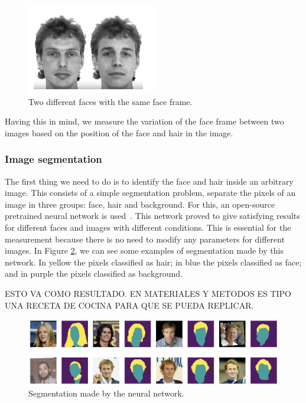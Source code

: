 \documentclass[review]{elsarticle}
\begin{document}
\begin{figure}[H]
  \includegraphics[width=0.5\textwidth, center]{Images/face_frame.png}
  \caption{Two different faces with the same face frame.}
  \label{fig:faceframe}
\end{figure}

Having this in mind, we measure the variation of the face frame between two images based on the position of the face and hair in the image.

\subsubsection{Image segmentation}
The first thing we need to do is to identify the face and hair inside an arbitrary image. This consists of a simple segmentation problem, separate the pixels of an image in three groups: face, hair and background. For this, an open-source pretrained neural network is used~\citep{segmentationgithub}. This network proved to give satisfying results for different faces and images with different conditions. This is essential for the measurement because there is no need to modify any parameters for different images. In Figure \ref{fig:segmentation}, we can see some examples of segmentation made by this network. In yellow the pixels classified as hair; in blue the pixels classified as face; and in purple the pixels classified as background.


ESTO VA COMO RESULTADO.  EN MATERIALES Y METODOS ES TIPO UNA RECETA DE COCINA PARA QUE SE PUEDA REPLICAR.

\begin{figure}[H]
  \includegraphics[width=\linewidth, center]{Images/segmentation.png}
  \caption{Segmentation made by the neural network.~\citep{segmentationgithub}}
  \label{fig:segmentation}
\end{figure}
\end{document}
